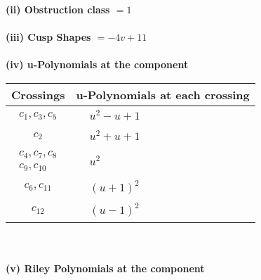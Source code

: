 \documentclass[1p]{elsarticle_modified}
\theoremstyle{definition}
\begin{document}
\flushleft \textbf{(ii) Obstruction class $= 1$}\\~\\
\flushleft \textbf{(iii) Cusp Shapes $= -4 v+11$}\\~\\
\newpage\renewcommand{\arraystretch}{1}
\flushleft \textbf{(iv) u-Polynomials at the component}\newline \\
\begin{tabular}{m{50pt}|m{274pt}}
Crossings & \hspace{64pt}u-Polynomials at each crossing \\
\hline $$\begin{aligned}c_{1},c_{3},c_{5}\end{aligned}$$&$\begin{aligned}
&u^2- u+1
\end{aligned}$\\
\hline $$\begin{aligned}c_{2}\end{aligned}$$&$\begin{aligned}
&u^2+u+1
\end{aligned}$\\
\hline $$\begin{aligned}c_{4},c_{7},c_{8}\\c_{9},c_{10}\end{aligned}$$&$\begin{aligned}
&u^2
\end{aligned}$\\
\hline $$\begin{aligned}c_{6},c_{11}\end{aligned}$$&$\begin{aligned}
&(u+1)^2
\end{aligned}$\\
\hline $$\begin{aligned}c_{12}\end{aligned}$$&$\begin{aligned}
&(u-1)^2
\end{aligned}$\\
\hline
\end{tabular}\\~\\
\newpage\renewcommand{\arraystretch}{1}
\flushleft \textbf{(v) Riley Polynomials at the component}\newline \\
\end{document}
